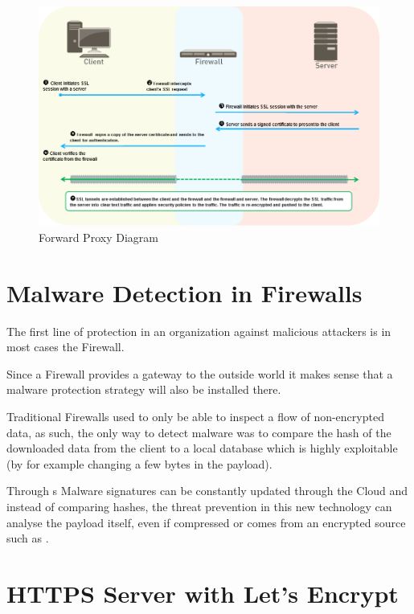 \begin{figure}[!hb]
 \centering
 \includegraphics[width=13cm]{img/ssl_decryption_diagram.png}
 \caption{ Forward Proxy Diagram\cite{ibm-handshake}}
 \label{SSL Forward Diagram}
\end{figure}

\newpage

\section{Malware Detection in Firewalls}

The first line of protection in an organization against malicious attackers is in most cases the Firewall.

Since a Firewall provides a gateway to the outside world it makes sense that a malware protection strategy will also be installed there.

Traditional Firewalls used to only be able to inspect a flow of non-encrypted data, as such, the only way to detect malware was to compare the hash of the downloaded data from the client to a local database which is highly exploitable (by for example changing a few bytes in the payload).

Through s Malware signatures can be constantly updated through the Cloud and instead of comparing hashes, the threat prevention in this new technology can analyse the payload itself, even if compressed or comes from an encrypted source such as .

\section{HTTPS  Server with Let's Encrypt}

